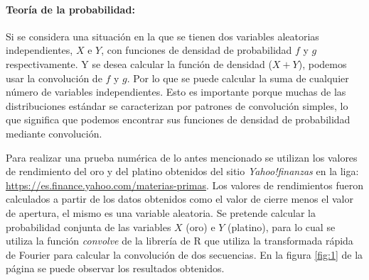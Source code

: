 \documentclass{article}
\begin{document}
\paragraph{Teoría de la probabilidad:} Si se considera una situación en la que se tienen dos variables aleatorias independientes,  $X$ e $Y$, con funciones de densidad de probabilidad $f$ y $g$ respectivamente. Y se desea calcular la función de densidad ($X+Y$), podemos usar la convolución de $f$ y $g$. Por lo que se puede calcular la suma de cualquier número de variables independientes. Esto es importante porque muchas de las distribuciones estándar se caracterizan por patrones de convolución simples, lo que significa que podemos encontrar sus funciones de densidad de probabilidad mediante convolución.

Para realizar una prueba numérica de lo antes mencionado se utilizan los valores de rendimiento del oro y del platino obtenidos del sitio \textit{Yahoo!finanzas} en la liga: \href{https://es.finance.yahoo.com/materias-primas}{https://es.finance.yahoo.com/materias-primas}. Los valores de rendimientos fueron calculados a partir de los datos obtenidos como el valor de cierre menos el valor de apertura, el mismo es una variable aleatoria. Se pretende calcular la probabilidad conjunta de las variables $X$ (oro) e $Y$ (platino), para lo cual se utiliza la función \textit{convolve} de la librería de R que utiliza la transformada rápida de Fourier para calcular la convolución de dos secuencias. En la figura \ref{fig:1} de la página \pageref{fig:1} se puede observar los resultados obtenidos. 
\end{document}
